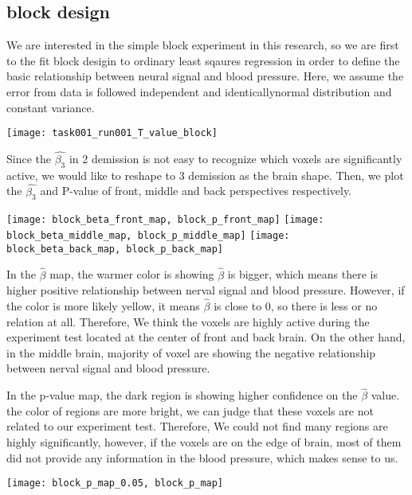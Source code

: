 \subsection{block design}
We are interested in the simple block experiment in this research, so we are 
first to the fit block desigin to ordinary least sqaures regression in order to
define the basic relationship between neural signal and blood pressure. Here, 
we assume the error from data is followed independent and identicallynormal
distribution and constant variance.

\texttt{[image: task001\_run001\_T\_value\_block]}
\label{T-value of $\hat{\beta_{3}}$ in block design OLS}

Since the $\hat{\beta_{3}}$ in 2 demission is not easy to recognize which voxels
are significantly active, we would like to reshape to 3 demission as the brain 
shape. Then, we plot the $\hat{\beta_{3}}$ and P-value of front, middle and 
back perspectives respectively.

\texttt{[image: block\_beta\_front\_map, block\_p\_front\_map]}
\label{Front perspective of brain in block design}
\texttt{[image: block\_beta\_middle\_map, block\_p\_middle\_map]}
\label{Middle perspective of brain in block design}
\texttt{[image: block\_beta\_back\_map, block\_p\_back\_map]}
\label{Back perspective of brain in block design}

In the $\hat{\beta}$ map, the warmer color is showing $\hat{\beta}$ is 
bigger, which means there is higher positive relationship between nerval signal and
blood pressure. However, if the color is more likely yellow, it means 
$\hat{\beta}$ is close to 0, so there is less or no relation at all. 
Therefore, We think the voxels are highly active during the experiment test 
located at the center of front and back brain. On the other hand, in the middle
brain, majority of voxel are showing the negative relationship between nerval
signal and blood pressure.

In the p-value map, the dark region is showing higher confidence on the 
$\hat{\beta}$ value. the color of regions are more bright, we can judge that 
these voxels are not related to our experiment test. Therefore, We could not 
find many regions are highly significantly, however, if the voxels are on the 
edge of brain, most of them did not provide any information in the blood 
pressure, which makes sense to us.

\texttt{[image: block\_p\_map\_0.05, block\_p\_map]}
\label{highly significant voxels in the block design}

